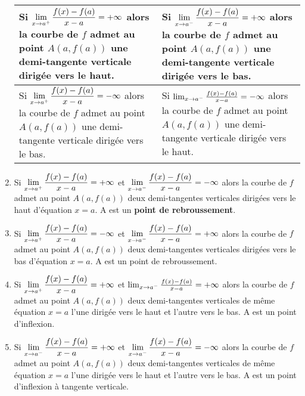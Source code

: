\begin{enumerate}
\medskip
\begin{tabularx}{\textwidth}{|X|X|}
\hline 
Si $ \displaystyle\lim_{x \to a^{+}} \frac{f(x)-f(a)}{x-a}=+\infty $ alors
la courbe de $f$ admet au point
$A (a, f (a))$ une demi-tangente
verticale dirigée vers le haut.
 & Si $\displaystyle \lim_{x \to a^{-}} \frac{f(x)-f(a)}{x-a}=+\infty $ alors 
la courbe de $f$ admet au point
$A (a, f (a))$ une demi-tangente
verticale dirigée vers le bas.  \\
\hline
Si $ \displaystyle\lim_{x \to a^{+}} \frac{f(x)-f(a)}{x-a}=-\infty $ alors
la courbe de $f$ admet au point
$A (a, f (a))$ une demi-tangente
verticale dirigée vers le bas. 
& Si  $ \lim_{x \to a^{-}} \frac{f(x)-f(a)}{x-a}=-\infty $ alors
la courbe de $f$ admet au point
$A (a, f (a))$ une demi-tangente
verticale dirigée vers le haut. \\
 \hline
\end{tabularx}
\item Si $\displaystyle \lim_{x \to a^{+}} \frac{f(x)-f(a)}{x-a}=+\infty $   et $ \displaystyle\lim_{x \to a^{-}} \frac{f(x)-f(a)}{x-a}=-\infty $ alors la courbe de $ f $ admet  au  point $ A (a, f (a)) $ deux demi-tangentes verticales  dirigées vers le haut  d'équation $ x=a $.  A est un \textbf{point de rebroussement}.
\item Si $\displaystyle \lim_{x \to a^{+}} \frac{f(x)-f(a)}{x-a}=-\infty $   et $\displaystyle \lim_{x \to a^{-}} \frac{f(x)-f(a)}{x-a}=+\infty $ alors la courbe de $ f $ admet  au  point $ A (a, f (a)) $ deux demi-tangentes verticales  dirigées vers le bas  d'équation $ x=a $.  A est un point de rebroussement.
\item Si $ \displaystyle\lim_{x \to a^{+}} \frac{f(x)-f(a)}{x-a}=+\infty $   et $ \lim_{x \to a^{-}} \frac{f(x)-f(a)}{x-a}=+\infty $ alors la courbe de $ f $ admet  au  point $ A (a, f (a)) $ deux demi-tangentes verticales de même équation $ x=a $ l'une dirigée vers le haut et l'autre vers le bas.  A est un point d'inflexion.
\item Si $ \displaystyle \lim_{x \to a^{-}} \frac{f(x)-f(a)}{x-a}=+\infty $   et $ \displaystyle \lim_{x \to a^{-}} \frac{f(x)-f(a)}{x-a}=-\infty $ alors la courbe de $ f $ admet  au  point $ A (a, f (a)) $ deux demi-tangentes verticales de même équation $ x=a $ l'une dirigée vers le haut et l'autre vers le bas.  A est un point d'inflexion à tangente verticale.
\end{enumerate}
